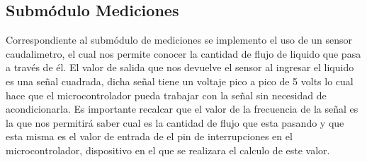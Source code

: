 \subsection{Submódulo Mediciones}
Correspondiente al submódulo de mediciones se implemento el uso de un sensor caudalimetro, el cual nos permite conocer la cantidad de flujo de liquido que pasa a través de él.
El valor de salida que nos devuelve el sensor al ingresar el liquido es una señal cuadrada, dicha señal tiene un voltaje pico a pico de 5 volts lo cual hace que el microcontrolador pueda trabajar con la señal sin necesidad de acondicionarla.
Es importante recalcar que el valor de la frecuencia de la señal es la que nos permitirá saber cual es la cantidad de flujo que esta pasando y que esta misma es el valor de entrada de el pin de interrupciones en el microcontrolador, dispositivo en el que se realizara el calculo de este valor.
